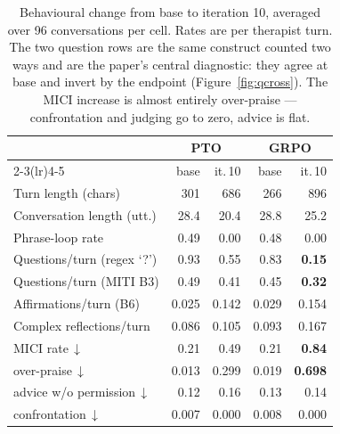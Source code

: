 \begin{table}[t]
\centering\small
\setlength{\tabcolsep}{3pt}
\begin{tabular}{@{}lrrrr@{}}
\toprule
& \multicolumn{2}{c}{\textbf{PTO}} & \multicolumn{2}{c}{\textbf{GRPO}} \\
\cmidrule(lr){2-3}\cmidrule(lr){4-5}
& base & it.\,10 & base & it.\,10 \\
\midrule
Turn length (chars)        & 301  & 686   & 266  & 896   \\
Conversation length (utt.) & 28.4 & 20.4  & 28.8 & 25.2  \\
Phrase-loop rate           & 0.49 & 0.00  & 0.48 & 0.00  \\
\midrule
Questions/turn (regex `?') & 0.93 & 0.55  & 0.83 & \textbf{0.15} \\
Questions/turn (MITI B3)   & 0.49 & 0.41  & 0.45 & \textbf{0.32} \\
Affirmations/turn (B6)     & 0.025& 0.142 & 0.029& 0.154 \\
Complex reflections/turn   & 0.086& 0.105 & 0.093& 0.167 \\
\midrule
MICI rate\,$\downarrow$    & 0.21 & 0.49  & 0.21 & \textbf{0.84} \\
\quad over-praise\,$\downarrow$ & 0.013& 0.299 & 0.019& \textbf{0.698} \\
\quad advice w/o permission\,$\downarrow$ & 0.12 & 0.16 & 0.13 & 0.14 \\
\quad confrontation\,$\downarrow$ & 0.007& 0.000 & 0.008& 0.000 \\
\bottomrule
\end{tabular}
\caption{Behavioural change from base to iteration 10, averaged over 96 conversations per
cell. Rates are per therapist turn. The two question rows are the same construct counted two
ways and are the paper's central diagnostic: they agree at base and invert by the endpoint
(Figure~\ref{fig:qcross}). The MICI increase is almost entirely over-praise --- confrontation
and judging go to zero, advice is flat.}
\label{tab:behaviour}
\end{table}
